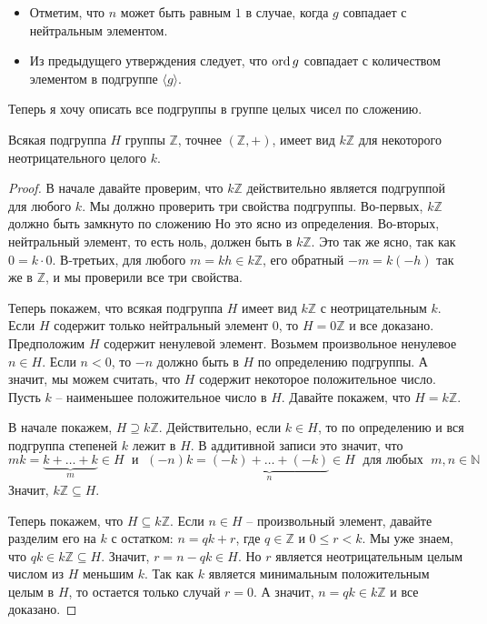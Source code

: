 \begin{itemize}
\item Отметим, что $n$ может быть равным $1$ в случае, когда $g$ совпадает с нейтральным элементом.

\item Из предыдущего утверждения следует, что $\operatorname{ord} g$ совпадает с количеством элементом в подгруппе $\langle g \rangle$.
\end{itemize}

Теперь я хочу описать все подгруппы в группе целых чисел по сложению.

\begin{claim}
\label{claim::Zsubgroups}
Всякая подгруппа $H$ группы $\mathbb Z$, точнее $(\mathbb Z, +)$, имеет вид $k\mathbb Z$ для некоторого неотрицательного целого $k$.
\end{claim}
\begin{proof}
В начале давайте проверим, что $k \mathbb Z$ действительно является подгруппой для любого $k$.
Мы должно проверить три свойства подгруппы.
Во-первых, $k\mathbb Z$ должно быть замкнуто по сложению
Но это ясно из определения.
Во-вторых, нейтральный элемент, то есть ноль, должен быть в $k\mathbb Z$.
Это так же ясно, так как $0 = k \cdot 0$.
В-третьих, для любого $m = kh \in k\mathbb Z$, его обратный $-m= k(-h)$ так же в $\mathbb Z$, и мы проверили все три свойства.

Теперь покажем, что всякая подгруппа $H$ имеет вид $k \mathbb Z$ с неотрицательным $k$.
Если $H$ содержит только нейтральный элемент $0$,  то $H = 0\mathbb Z$ и все доказано.
Предположим $H$ содержит ненулевой элемент.
Возьмем произвольное ненулевое $n \in H$.
Если $n < 0$, то $-n$ должно быть в $H$ по определению подгруппы.
А значит, мы можем считать, что $H$ содержит некоторое положительное число.
Пусть $k$ -- наименьшее положительное число в $H$.
Давайте покажем, что $H = k \mathbb Z$.

В начале покажем, $H \supseteq k \mathbb Z$.
Действительно, если $k\in H$, то по определению и вся подгруппа степеней $k$ лежит в $H$.
В аддитивной записи это значит, что
\[
mk  = \underbrace{k + \ldots + k}_m \in H\;\text{ и }\;(-n)k=\underbrace{(-k) + \ldots + (-k)}_n\in H\; \text{ для любых }\;m, n\in \mathbb N
\]
Значит, $k\mathbb Z\subseteq H$.

Теперь покажем, что $H\subseteq k\mathbb Z$.
Если $n\in H$ -- произвольный элемент, давайте разделим его на $k$ с остатком: $n = q k + r$, где $q\in \mathbb Z$ и $0 \leqslant r < k$.
Мы уже знаем, что $qk \in k\mathbb Z\subseteq H$.
Значит, $r = n - qk \in H$.
Но $r$ является неотрицательным целым числом из $H$ меньшим $k$.
Так как $k$ является минимальным положительным целым в $H$, то остается только случай $r = 0$.
А значит, $n = qk\in k\mathbb Z$ и все доказано.
\end{proof}


